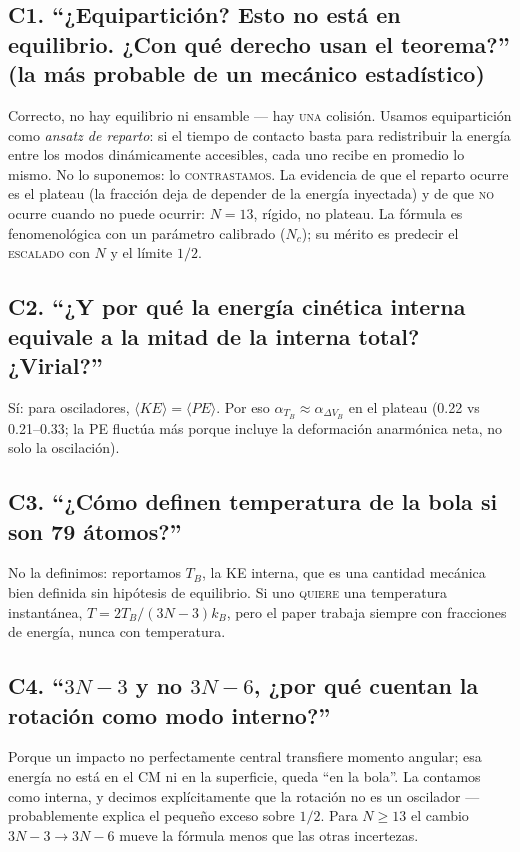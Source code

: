 \documentclass[11pt,a4paper]{article}
\begin{document}
\subsection*{C1. ``¿Equipartición? Esto no está en equilibrio. ¿Con qué
derecho usan el teorema?'' (la más probable de un mecánico estadístico)}
\begin{respuesta}
Correcto, no hay equilibrio ni ensamble --- hay \textsc{una} colisión.
Usamos equipartición como \emph{ansatz de reparto}: si el tiempo de
contacto basta para redistribuir la energía entre los modos dinámicamente
accesibles, cada uno recibe en promedio lo mismo. No lo suponemos: lo
\textsc{contrastamos}. La evidencia de que el reparto ocurre es el
plateau (la fracción deja de depender de la energía inyectada) y de que
\textsc{no} ocurre cuando no puede ocurrir: $N=13$, rígido, no plateau.
La fórmula es fenomenológica con un parámetro calibrado ($N_c$); su
mérito es predecir el \textsc{escalado} con $N$ y el límite $1/2$.
\end{respuesta}

\subsection*{C2. ``¿Y por qué la energía cinética interna equivale a la
mitad de la interna total? ¿Virial?''}
\begin{respuesta}
Sí: para osciladores, $\langle KE\rangle=\langle PE\rangle$. Por eso
$\alpha_{T_B}\approx\alpha_{\Delta V_B}$ en el plateau (0.22 vs
0.21--0.33; la PE fluctúa más porque incluye la deformación anarmónica
neta, no solo la oscilación).
\end{respuesta}

\subsection*{C3. ``¿Cómo definen temperatura de la bola si son 79
átomos?''}
\begin{respuesta}
No la definimos: reportamos $T_B$, la KE interna, que es una cantidad
mecánica bien definida sin hipótesis de equilibrio. Si uno \textsc{quiere}
una temperatura instantánea, $T=2T_B/(3N-3)k_B$, pero el paper trabaja
siempre con fracciones de energía, nunca con temperatura.
\end{respuesta}

\subsection*{C4. ``$3N-3$ y no $3N-6$, ¿por qué cuentan la rotación como
modo interno?''}
\begin{respuesta}
Porque un impacto no perfectamente central transfiere momento angular;
esa energía no está en el CM ni en la superficie, queda ``en la bola''.
La contamos como interna, y decimos explícitamente que la rotación no es
un oscilador --- probablemente explica el pequeño exceso sobre $1/2$.
Para $N\geq13$ el cambio $3N-3\to3N-6$ mueve la fórmula menos que las
otras incertezas.
\end{respuesta}
\end{document}

